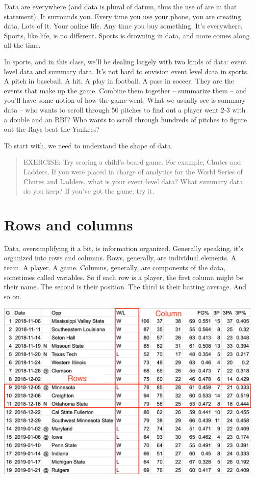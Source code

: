 \documentclass[
]{book}
\begin{document}
Data are everywhere (and data is plural of datum, thus the use of are in that statement). It surrounds you. Every time you use your phone, you are creating data. Lots of it. Your online life. Any time you buy something. It's everywhere. Sports, like life, is no different. Sports is drowning in data, and more comes along all the time.

In sports, and in this class, we'll be dealing largely with two kinds of data: event level data and summary data. It's not hard to envision event level data in sports. A pitch in baseball. A hit. A play in football. A pass in soccer. They are the events that make up the game. Combine them together -- summarize them -- and you'll have some notion of how the game went. What we usually see is summary data -- who wants to scroll through 50 pitches to find out a player went 2-3 with a double and an RBI? Who wants to scroll through hundreds of pitches to figure out the Rays beat the Yankees?

To start with, we need to understand the shape of data.

\begin{quote}
EXERCISE: Try scoring a child's board game. For example, Chutes and Ladders. If you were placed in charge of analytics for the World Series of Chutes and Ladders, what is your event level data? What summary data do you keep? If you've got the game, try it.
\end{quote}

\hypertarget{rows-and-columns}{%
\section{Rows and columns}\label{rows-and-columns}}

Data, oversimplifying it a bit, is information organized. Generally speaking, it's organized into rows and columns. Rows, generally, are individual elements. A team. A player. A game. Columns, generally, are components of the data, sometimes called variables. So if each row is a player, the first column might be their name. The second is their position. The third is their batting average. And so on.

\includegraphics[width=22in]{images/data1}
\end{document}
